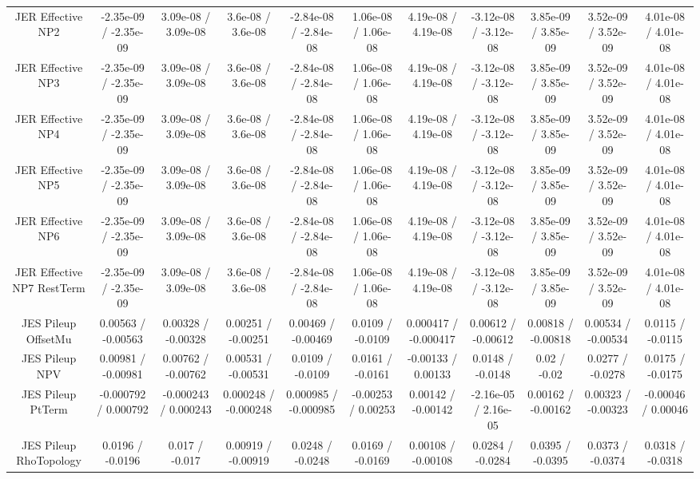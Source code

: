 \begin{table}[htbp]
\begin{center}
\begin{tabular}{|c|c|c|c|c|c|c|c|c|c|c|}
  JER Effective NP2 & -2.35e-09 / -2.35e-09 & 3.09e-08 / 3.09e-08 & 3.6e-08 / 3.6e-08 & -2.84e-08 / -2.84e-08 & 1.06e-08 / 1.06e-08 & 4.19e-08 / 4.19e-08 & -3.12e-08 / -3.12e-08 & 3.85e-09 / 3.85e-09 & 3.52e-09 / 3.52e-09 & 4.01e-08 / 4.01e-08 \\ 
  JER Effective NP3 & -2.35e-09 / -2.35e-09 & 3.09e-08 / 3.09e-08 & 3.6e-08 / 3.6e-08 & -2.84e-08 / -2.84e-08 & 1.06e-08 / 1.06e-08 & 4.19e-08 / 4.19e-08 & -3.12e-08 / -3.12e-08 & 3.85e-09 / 3.85e-09 & 3.52e-09 / 3.52e-09 & 4.01e-08 / 4.01e-08 \\ 
  JER Effective NP4 & -2.35e-09 / -2.35e-09 & 3.09e-08 / 3.09e-08 & 3.6e-08 / 3.6e-08 & -2.84e-08 / -2.84e-08 & 1.06e-08 / 1.06e-08 & 4.19e-08 / 4.19e-08 & -3.12e-08 / -3.12e-08 & 3.85e-09 / 3.85e-09 & 3.52e-09 / 3.52e-09 & 4.01e-08 / 4.01e-08 \\ 
  JER Effective NP5 & -2.35e-09 / -2.35e-09 & 3.09e-08 / 3.09e-08 & 3.6e-08 / 3.6e-08 & -2.84e-08 / -2.84e-08 & 1.06e-08 / 1.06e-08 & 4.19e-08 / 4.19e-08 & -3.12e-08 / -3.12e-08 & 3.85e-09 / 3.85e-09 & 3.52e-09 / 3.52e-09 & 4.01e-08 / 4.01e-08 \\ 
  JER Effective NP6 & -2.35e-09 / -2.35e-09 & 3.09e-08 / 3.09e-08 & 3.6e-08 / 3.6e-08 & -2.84e-08 / -2.84e-08 & 1.06e-08 / 1.06e-08 & 4.19e-08 / 4.19e-08 & -3.12e-08 / -3.12e-08 & 3.85e-09 / 3.85e-09 & 3.52e-09 / 3.52e-09 & 4.01e-08 / 4.01e-08 \\ 
  JER Effective NP7 RestTerm & -2.35e-09 / -2.35e-09 & 3.09e-08 / 3.09e-08 & 3.6e-08 / 3.6e-08 & -2.84e-08 / -2.84e-08 & 1.06e-08 / 1.06e-08 & 4.19e-08 / 4.19e-08 & -3.12e-08 / -3.12e-08 & 3.85e-09 / 3.85e-09 & 3.52e-09 / 3.52e-09 & 4.01e-08 / 4.01e-08 \\ 
  JES Pileup OffsetMu & 0.00563 / -0.00563 & 0.00328 / -0.00328 & 0.00251 / -0.00251 & 0.00469 / -0.00469 & 0.0109 / -0.0109 & 0.000417 / -0.000417 & 0.00612 / -0.00612 & 0.00818 / -0.00818 & 0.00534 / -0.00534 & 0.0115 / -0.0115 \\ 
  JES Pileup NPV & 0.00981 / -0.00981 & 0.00762 / -0.00762 & 0.00531 / -0.00531 & 0.0109 / -0.0109 & 0.0161 / -0.0161 & -0.00133 / 0.00133 & 0.0148 / -0.0148 & 0.02 / -0.02 & 0.0277 / -0.0278 & 0.0175 / -0.0175 \\ 
  JES Pileup PtTerm & -0.000792 / 0.000792 & -0.000243 / 0.000243 & 0.000248 / -0.000248 & 0.000985 / -0.000985 & -0.00253 / 0.00253 & 0.00142 / -0.00142 & -2.16e-05 / 2.16e-05 & 0.00162 / -0.00162 & 0.00323 / -0.00323 & -0.00046 / 0.00046 \\ 
  JES Pileup RhoTopology & 0.0196 / -0.0196 & 0.017 / -0.017 & 0.00919 / -0.00919 & 0.0248 / -0.0248 & 0.0169 / -0.0169 & 0.00108 / -0.00108 & 0.0284 / -0.0284 & 0.0395 / -0.0395 & 0.0373 / -0.0374 & 0.0318 / -0.0318 \\ 

\end{tabular}
\end{center}
\end{table}
